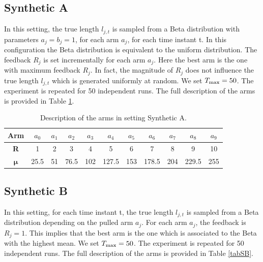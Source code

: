 \subsection{Synthetic A}\label{SA}
In this setting, the true length $l_{j,t}$ is sampled from a Beta distribution with parameters $a_j = b_j = 1$, for each arm $a_j$, for each time instant t. In this configuration the Beta distribution is equivalent to the uniform distribution. The feedback $R_j$ is set incrementally for each arm $a_j$. Here the best arm is the one with maximum feedback $R_j$. In fact, the magnitude of $R_j$ does not influence the true length $l_{j,t}$ which is generated uniformly at random.  We set $T_{\textnormal{max}} = 50$. The experiment is repeated for 50 independent runs. The full description of the arms is provided in Table \ref{tabSA}.



\begin{table}[H]
	
	\centering	
	\caption{Description of the arms in setting Synthetic A.}
	\begin{tabular}{|c|cccccccccc|}
		\hline
		\textbf{Arm}       & $a_0$ & $a_1$ & $a_2$ & $a_3$ & $a_4$ & $a_5$ & $a_6$ & $a_7$ & $a_8$ & $a_9$ \\ \hline
		\textbf{R}         & 1     & 2     & 3     & 4     & 5     & 6     & 7     & 8     & 9     & 10    \\
		$\boldsymbol{\mu}$ & 25.5  & 51    & 76.5  & 102   & 127.5 & 153   & 178.5 & 204   & 229.5 & 255   \\ \hline
	\end{tabular}
	
\label{tabSA}
\end{table}
\subsection{Synthetic B}\label{SB}
In this setting, for each time instant t, the true length $l_{j,t}$ is sampled from a Beta distribution depending on the pulled arm $a_j$. For each arm $a_j$, the feedback is $R_j=1$. This implies that the best arm is the one which is associated to the Beta with the highest mean. We set $T_{\textnormal{max}}=50$. The experiment is repeated for 50 independent runs. The full description of the arms is provided in Table \ref{tabSB}.


